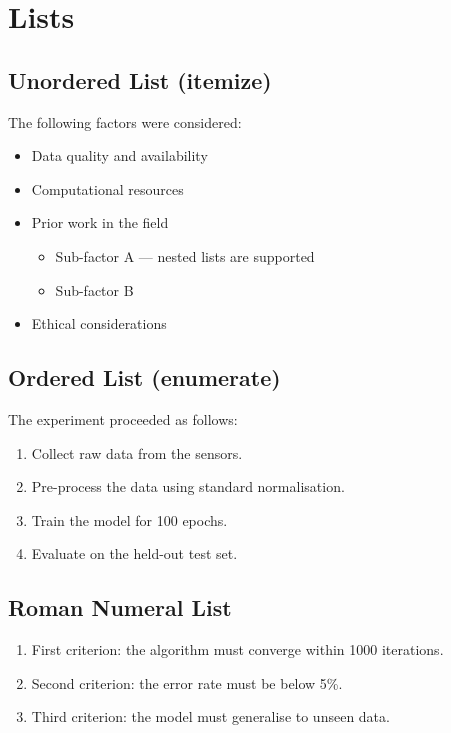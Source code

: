 \section{Lists}
\label{sec:lists}

\subsection{Unordered List (itemize)}

The following factors were considered:
\begin{itemize}
  \item Data quality and availability
  \item Computational resources
  \item Prior work in the field
  \begin{itemize}
    \item Sub-factor A --- nested lists are supported
    \item Sub-factor B
  \end{itemize}
  \item Ethical considerations
\end{itemize}

\subsection{Ordered List (enumerate)}

The experiment proceeded as follows:
\begin{enumerate}
  \item Collect raw data from the sensors.
  \item Pre-process the data using standard normalisation.
  \item Train the model for 100 epochs.
  \item Evaluate on the held-out test set.
\end{enumerate}

\subsection{Roman Numeral List}

\begin{enumerate}[label=\roman*.]
  \item First criterion: the algorithm must converge within 1000 iterations.
  \item Second criterion: the error rate must be below 5\%.
  \item Third criterion: the model must generalise to unseen data.
\end{enumerate}

